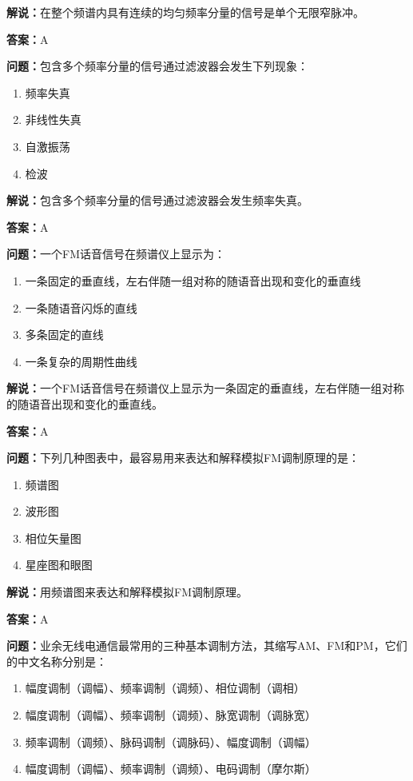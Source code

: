 \textbf{解说：}在整个频谱内具有连续的均匀频率分量的信号是单个无限窄脉冲。%

\textbf{答案：}A

\textbf{问题：}包含多个频率分量的信号通过滤波器会发生下列现象：

\begin{enumerate}[label=\Alph*), leftmargin=3em]
	\item 频率失真
	\item 非线性失真
	\item 自激振荡
	\item 检波
\end{enumerate}

\textbf{解说：}包含多个频率分量的信号通过滤波器会发生频率失真。%

\textbf{答案：}A

\textbf{问题：}一个FM话音信号在频谱仪上显示为：

\begin{enumerate}[label=\Alph*), leftmargin=3em]
	\item 一条固定的垂直线，左右伴随一组对称的随语音出现和变化的垂直线
	\item 一条随语音闪烁的直线
	\item 多条固定的直线
	\item 一条复杂的周期性曲线
\end{enumerate}

\textbf{解说：}一个FM话音信号在频谱仪上显示为一条固定的垂直线，左右伴随一组对称的随语音出现和变化的垂直线。%

\textbf{答案：}A

\textbf{问题：}下列几种图表中，最容易用来表达和解释模拟FM调制原理的是：

\begin{enumerate}[label=\Alph*), leftmargin=3em]
	\item 频谱图
	\item 波形图
	\item 相位矢量图
	\item 星座图和眼图
\end{enumerate}

\textbf{解说：}用频谱图来表达和解释模拟FM调制原理。%

\textbf{答案：}A

\textbf{问题：}业余无线电通信最常用的三种基本调制方法，其缩写AM、FM和PM，它们的中文名称分别是：

\begin{enumerate}[label=\Alph*), leftmargin=3em]
	\item 幅度调制（调幅）、频率调制（调频）、相位调制（调相）
	\item 幅度调制（调幅）、频率调制（调频）、脉宽调制（调脉宽）
	\item 频率调制（调频）、脉码调制（调脉码）、幅度调制（调幅）
	\item 幅度调制（调幅）、频率调制（调频）、电码调制（摩尔斯）
\end{enumerate}

